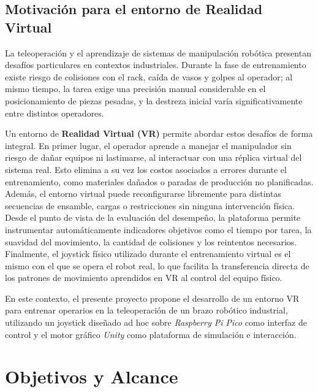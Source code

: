 \documentclass[12pt]{article}
\begin{document}
\subsection{Motivación para el entorno de Realidad Virtual}

La teleoperación y el aprendizaje de sistemas de manipulación robótica presentan desafíos particulares en contextos industriales. Durante la fase de entrenamiento existe riesgo de colisiones con el rack, caída de vasos y golpes al operador; al mismo tiempo, la tarea exige una precisión manual considerable en el posicionamiento de piezas pesadas, y la destreza inicial varía significativamente entre distintos operadores.

Un entorno de \textbf{Realidad Virtual (VR)} permite abordar estos desafíos de forma integral. En primer lugar, el operador aprende a manejar el manipulador sin riesgo de dañar equipos ni lastimarse, al interactuar con una réplica virtual del sistema real. Esto elimina a su vez los costos asociados a errores durante el entrenamiento, como materiales dañados o paradas de producción no planificadas. Además, el entorno virtual puede reconfigurarse libremente para distintas secuencias de ensamble, cargas o restricciones sin ninguna intervención física. Desde el punto de vista de la evaluación del desempeño, la plataforma permite instrumentar automáticamente indicadores objetivos como el tiempo por tarea, la suavidad del movimiento, la cantidad de colisiones y los reintentos necesarios. Finalmente, el joystick físico utilizado durante el entrenamiento virtual es el mismo con el que se opera el robot real, lo que facilita la transferencia directa de los patrones de movimiento aprendidos en VR al control del equipo físico.

En este contexto, el presente proyecto propone el desarrollo de un entorno VR para entrenar operarios en la teleoperación de un brazo robótico industrial, utilizando un joystick diseñado ad hoc sobre \textit{Raspberry Pi Pico} como interfaz de control y el motor gráfico \textit{Unity} como plataforma de simulación e interacción.


\section{Objetivos y Alcance}
\end{document}
